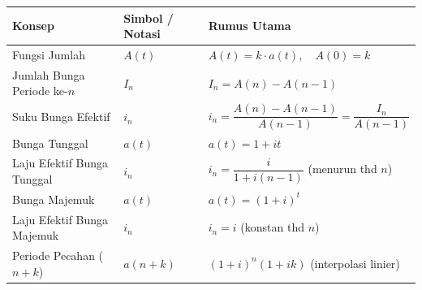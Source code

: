 \documentclass[11pt,a4paper]{article}
\begin{document}
\begin{center}
\renewcommand{\arraystretch}{1.5}
\begin{tabular}{lll}
\toprule
\textbf{Konsep} & \textbf{Simbol / Notasi} & \textbf{Rumus Utama} \\
\midrule
Fungsi Jumlah & $A(t)$ & $A(t) = k \cdot a(t), \quad A(0) = k$ \\
Jumlah Bunga Periode ke-$n$ & $I_n$ & $I_n = A(n) - A(n-1)$ \\
Suku Bunga Efektif & $i_n$ & $i_n = \dfrac{A(n) - A(n-1)}{A(n-1)} = \dfrac{I_n}{A(n-1)}$ \\
Bunga Tunggal & $a(t)$ & $a(t) = 1 + it$ \\
Laju Efektif Bunga Tunggal & $i_n$ & $i_n = \dfrac{i}{1 + i(n-1)}$ (menurun thd $n$) \\
Bunga Majemuk & $a(t)$ & $a(t) = (1+i)^t$ \\
Laju Efektif Bunga Majemuk & $i_n$ & $i_n = i$ (konstan thd $n$) \\
Periode Pecahan ($n+k$) & $a(n+k)$ & $(1+i)^n(1+ik)$ (interpolasi linier) \\
\bottomrule
\end{tabular}
\end{center}
\end{document}
